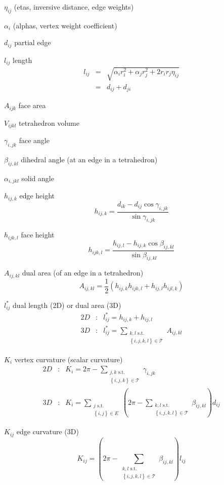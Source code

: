 $\eta _{ij}$ (etas, inversive distance, edge weights)

$\alpha _{i}$ (alphas, vertex weight coefficient)

$d_{ij}$ partial edge

$l_{ij}$ length%
\begin{eqnarray*}
l_{ij} &=&\sqrt{\alpha _{i}r_{i}^{2}+\alpha _{j}r_{j}^{2}+2r_{i}r_{j}\eta
_{ij}} \\
&=&d_{ij}+d_{ji}
\end{eqnarray*}

$A_{ijk}$ face area

$V_{ijkl}$ tetrahedron volume

$\gamma _{i,jk}$ face angle

$\beta _{ij,kl}$ dihedral angle (at an edge in a tetrahedron)

$\alpha _{i,jkl}$ solid angle

$h_{ij,k}$ edge height%
\[
h_{ij,k}=\frac{d_{ik}-d_{ij}\cos \gamma _{i,jk}}{\sin \gamma _{i,jk}} 
\]

$h_{ijk,l}$ face height%
\[
h_{ijk,l}=\frac{h_{ij,l}-h_{ij,k}\cos \beta _{ij,kl}}{\sin \beta _{ij,kl}} 
\]

$A_{ij,kl}$ dual area (of an edge in a tetrahedron)%
\[
A_{ij,kl}=\frac{1}{2}\left( h_{ij,k}h_{ijk,l}+h_{ij,l}h_{ijl,k}\right) 
\]

$l_{ij}^{\ast }$ dual length (2D) or dual area (3D) 
\begin{eqnarray*}
2D &:&l_{ij}^{\ast }=h_{ij,k}+h_{ij,l} \\
3D &:&l_{ij}^{\ast }=\sum_{\substack{ k,l\text{ s.t.}  \\ \left\{
i,j,k,l\right\} \in \mathcal{T}}}A_{ij,kl}
\end{eqnarray*}

$K_{i}$ vertex curvature (scalar curvature)%
\begin{eqnarray*}
2D &:&K_{i}=2\pi -\sum_{\substack{ j,k\text{ s.t.}  \\ \left\{ i,j,k\right\}
\in \mathcal{T}}}\gamma _{i,jk} \\
3D &:&K_{i}=\sum_{\substack{ j\text{ s.t.}  \\ \left\{ i,j\right\} \in E}}%
\left( 2\pi -\sum_{\substack{ k,l\text{ s.t.}  \\ \left\{ i,j,k,l\right\}
\in \mathcal{T}}}\beta _{ij,kl}\right) d_{ij}
\end{eqnarray*}

$K_{ij}$ edge curvature (3D)%
\[
K_{ij}=\left( 2\pi -\sum_{\substack{ k,l\text{ s.t.}  \\ \left\{
i,j,k,l\right\} \in \mathcal{T}}}\beta _{ij,kl}\right) l_{ij} 
\]


